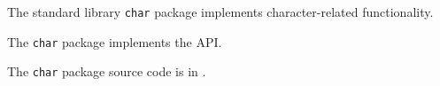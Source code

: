 
The standard library {\tt char} package implements character-related functionality.

The {\tt char} package implements the  API.

The {\tt char} package source code is in .



